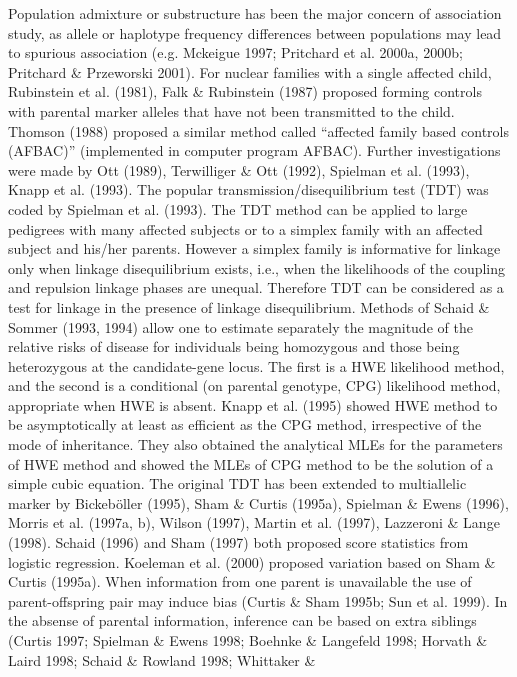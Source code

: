 Population admixture or substructure has been the major concern of association
study, as allele or haplotype frequency differences between populations may
lead to spurious association (e.g.  Mckeigue 1997; Pritchard et al.  2000a,
2000b; Pritchard \& Przeworski 2001).  For nuclear families with a single
affected child, Rubinstein et al.  (1981), Falk \& Rubinstein (1987) proposed
forming controls with parental marker alleles that have not been transmitted to
the child.  Thomson (1988) proposed a similar method called ``affected family
based controls (AFBAC)'' (implemented in computer program AFBAC).  Further
investigations were made by Ott (1989), Terwilliger \& Ott (1992), Spielman et
al.  (1993), Knapp et al.  (1993).  The popular transmission/disequilibrium
test (TDT) was coded by Spielman et al.  (1993).  The TDT method can be applied
to large pedigrees with many affected subjects or to a simplex family with an
affected subject and his/her parents.  However a simplex family is informative
for linkage only when linkage disequilibrium exists, i.e., when the likelihoods
of the coupling and repulsion linkage phases are unequal.  Therefore TDT can be
considered as a test for linkage in the presence of linkage disequilibrium.
Methods of Schaid \& Sommer (1993, 1994) allow one to estimate separately the
magnitude of the relative risks of disease for individuals being homozygous and
those being heterozygous at the candidate-gene locus.  The first is a HWE
likelihood method, and the second is a conditional (on parental genotype, CPG)
likelihood method, appropriate when HWE is absent.  Knapp et al.  (1995) showed
HWE method to be asymptotically at least as efficient as the CPG method,
irrespective of the mode of inheritance.  They also obtained the analytical
MLEs for the parameters of HWE method and showed the MLEs of CPG method to be
the solution of a simple cubic equation.  The original TDT has been extended to
multiallelic marker by Bickeb\"{o}ller (1995), Sham \& Curtis (1995a), Spielman
\& Ewens (1996), Morris et al.  (1997a, b), Wilson (1997), Martin et al.
(1997), Lazzeroni \& Lange (1998).  Schaid (1996) and Sham (1997) both proposed
score statistics from logistic regression.  Koeleman et al.  (2000) proposed
variation based on Sham \& Curtis (1995a).  When information from one parent is
unavailable the use of parent-offspring pair may induce bias (Curtis \& Sham
1995b; Sun et al.  1999).  In the absense of parental information, inference
can be based on extra siblings (Curtis 1997; Spielman \& Ewens 1998; Boehnke \&
Langefeld 1998; Horvath \& Laird 1998; Schaid \& Rowland 1998; Whittaker \&
